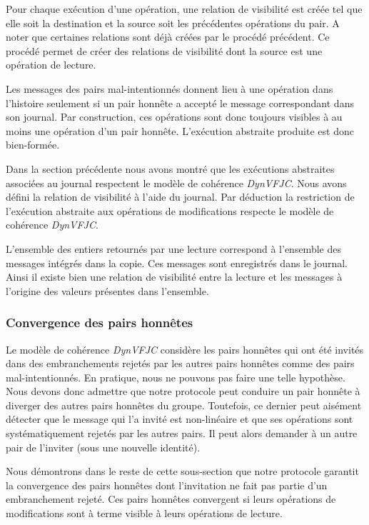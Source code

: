 Pour chaque exécution d'une opération, une relation de visibilité est créée tel que elle soit la destination et la source soit les précédentes opérations du pair.
A noter que certaines relations sont déjà créées par le procédé précédent.
Ce procédé permet de créer des relations de visibilité dont la source est une opération de lecture. 

Les messages des pairs mal-intentionnés donnent lieu à une opération dans l'histoire seulement si un pair honnête a accepté le message correspondant dans son journal.
Par construction, ces opérations sont donc toujours visibles à au moins une opération d'un pair honnête.
L'exécution abstraite produite est donc bien-formée.

Dans la section précédente nous avons montré que les exécutions abstraites associées au journal respectent le modèle de cohérence \emph{DynVFJC}.
Nous avons défini la relation de visibilité à l'aide du journal.
Par déduction la restriction de l'exécution abstraite aux opérations de modifications respecte le modèle de cohérence \emph{DynVFJC}.

L'ensemble des entiers retournés par une lecture correspond à l'ensemble des messages intégrés dans la copie. Ces messages sont enregistrés dans le journal.
Ainsi il existe bien une relation de visibilité entre la lecture et les messages à l'origine des valeurs présentes dans l'ensemble.

\subsubsection{Convergence des pairs honnêtes}

Le modèle de cohérence \emph{DynVFJC} considère les pairs honnêtes qui ont été invités dans des embranchements rejetés par les autres pairs honnêtes comme des pairs mal-intentionnés.
En pratique, nous ne pouvons pas faire une telle hypothèse.
Nous devons donc admettre que notre protocole peut conduire un pair honnête à diverger des autres pairs honnêtes du groupe.
Toutefois, ce dernier peut aisément détecter que le message qui l'a invité est non-linéaire et que ses opérations sont systématiquement rejetés par les autres pairs.
Il peut alors demander à un autre pair de l'inviter (sous une nouvelle identité).

Nous démontrons dans le reste de cette sous-section que notre protocole garantit la convergence des pairs honnêtes dont l'invitation ne fait pas partie d'un embranchement rejeté.
Ces pairs honnêtes convergent si leurs opérations de modifications sont à terme visible à leurs opérations de lecture.


